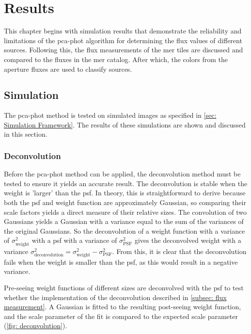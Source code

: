 \chapter{Results}
This chapter begins with simulation results that demonstrate the reliability and limitations of the \gls{pca-phot} algorithm for determining the flux values of different sources. Following this, the flux measurements of the \gls{mer} tiles are discussed and compared to the fluxes in the \gls{mer} catalog. After which, the colors from the aperture fluxes are used to classify sources.


\section{Simulation}

The \gls{pca-phot} method is tested on simulated images as specified in \autoref{sec: Simulation Framework}. The results of these simulations are shown and discussed in this section.


\subsection{Deconvolution}\label{subsec: Deconvolution}

Before the \gls{pca-phot} method can be applied, the deconvolution method must be tested to ensure it yields an accurate result. The deconvolution is stable when the weight is 'larger' than the \gls{psf}. In theory, this is straightforward to derive because both the \gls{psf} and weight function are approximately Gaussian, so comparing their scale factors yields a direct measure of their relative sizes. The convolution of two Gaussians yields a Gaussian with a variance equal to the sum of the variances of the original Gaussians. So the deconvolution of a weight function with a variance of $\sigma_\mathrm{weight}^2$ with a \gls{psf} with a variance of $\sigma_\mathrm{PSF}^2$ gives the deconvolved weight with a variance $\sigma^2_\mathrm{deconvolution}=\sigma^2_\mathrm{weight}-\sigma^2_\mathrm{PSF}$. From this, it is clear that the deconvolution fails when the weight is smaller than the \gls{psf}, as this would result in a negative variance. 

Pre-seeing weight functions of different sizes are deconvolved with the \gls{psf} to test whether the implementation of the deconvolution described in \autoref{subsec: flux measurement}. A Gaussian is fitted to the resulting post-seeing weight function, and the scale parameter of the fit is compared to the expected scale parameter (\autoref{fig: deconvolution}).  

